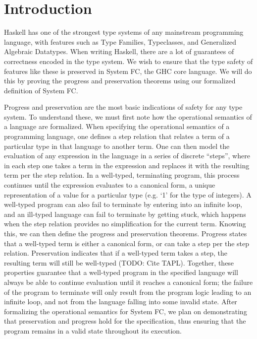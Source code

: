 \documentclass{sig-alternate}
\begin{document}
\section{Introduction}
\label{sec:intro}
Haskell has one of the strongest type systems of any mainstream programming language, with features such as Type Families, Typeclasses, and Generalized Algebraic Datatypes. When writing Haskell, there are a lot of guarantees of correctness encoded in the type system. We wish to ensure that the type safety of features like these is preserved in System FC, the GHC core language.  We will do this by proving the progress and preservation theorems using our formalized definition of System FC.

Progress and preservation are the most basic indications of safety for any type system. To understand these, we must first note how the operational semantics of a language are formalized. When specifying the operational semantics of a programming language, one defines a step relation that relates a term of a particular type in that language to another term. One can then model the evaluation of any expression in the language in a series of discrete “steps”, where in each step one takes a term in the expression and replaces it with the resulting term per the step relation. In a well-typed, terminating program, this process continues until the expression evaluates to a canonical form, a unique representation of a value for a particular type (e.g. ‘1’ for the type of integers). A well-typed program can also fail to terminate by entering into an infinite loop, and an ill-typed language can fail to terminate by getting stuck, which happens when the step relation provides no simplification for the current term.
Knowing this, we can then define the progress and preservation theorems. Progress states that a well-typed term is either a canonical form, or can take a step per the step relation. Preservation indicates that if a well-typed term takes a step, the resulting term will still be well-typed (TODO: Cite TAPL). Together, these properties guarantee that a well-typed program in the specified language will always be able to continue evaluation until it reaches a canonical form; the failure of the program to terminate will only result from the program logic leading to an infinite loop, and not from the language falling into some invalid state. After formalizing the operational semantics for System FC, we plan on demonstrating that preservation and progress hold for the specification, thus ensuring that the program remains in a valid state throughout its execution.
\end{document}
